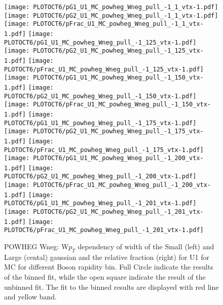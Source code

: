 \documentclass[41pt,a4paper,oneside]{report}
\begin{document}
\begin{figure}[h!]
  \begin{center}
    \texttt{[image: PLOTOCT6/pG1\_U1\_MC\_powheg\_Wneg\_pull\_-1\_1\_vtx-1.pdf]}
    \texttt{[image: PLOTOCT6/pG2\_U1\_MC\_powheg\_Wneg\_pull\_-1\_1\_vtx-1.pdf]}
    \texttt{[image: PLOTOCT6/pFrac\_U1\_MC\_powheg\_Wneg\_pull\_-1\_1\_vtx-1.pdf]} 
    \texttt{[image: PLOTOCT6/pG1\_U1\_MC\_powheg\_Wneg\_pull\_-1\_125\_vtx-1.pdf]}
    \texttt{[image: PLOTOCT6/pG2\_U1\_MC\_powheg\_Wneg\_pull\_-1\_125\_vtx-1.pdf]}
    \texttt{[image: PLOTOCT6/pFrac\_U1\_MC\_powheg\_Wneg\_pull\_-1\_125\_vtx-1.pdf]} 
    \texttt{[image: PLOTOCT6/pG1\_U1\_MC\_powheg\_Wneg\_pull\_-1\_150\_vtx-1.pdf]}
    \texttt{[image: PLOTOCT6/pG2\_U1\_MC\_powheg\_Wneg\_pull\_-1\_150\_vtx-1.pdf]}
    \texttt{[image: PLOTOCT6/pFrac\_U1\_MC\_powheg\_Wneg\_pull\_-1\_150\_vtx-1.pdf]} 
    \texttt{[image: PLOTOCT6/pG1\_U1\_MC\_powheg\_Wneg\_pull\_-1\_175\_vtx-1.pdf]}
    \texttt{[image: PLOTOCT6/pG2\_U1\_MC\_powheg\_Wneg\_pull\_-1\_175\_vtx-1.pdf]}
    \texttt{[image: PLOTOCT6/pFrac\_U1\_MC\_powheg\_Wneg\_pull\_-1\_175\_vtx-1.pdf]} 
    \texttt{[image: PLOTOCT6/pG1\_U1\_MC\_powheg\_Wneg\_pull\_-1\_200\_vtx-1.pdf]}
    \texttt{[image: PLOTOCT6/pG2\_U1\_MC\_powheg\_Wneg\_pull\_-1\_200\_vtx-1.pdf]}
    \texttt{[image: PLOTOCT6/pFrac\_U1\_MC\_powheg\_Wneg\_pull\_-1\_200\_vtx-1.pdf]} 
    \texttt{[image: PLOTOCT6/pG1\_U1\_MC\_powheg\_Wneg\_pull\_-1\_201\_vtx-1.pdf]}
    \texttt{[image: PLOTOCT6/pG2\_U1\_MC\_powheg\_Wneg\_pull\_-1\_201\_vtx-1.pdf]}
    \texttt{[image: PLOTOCT6/pFrac\_U1\_MC\_powheg\_Wneg\_pull\_-1\_201\_vtx-1.pdf]} 
    \caption{POWHEG Wneg: W$p_{T}$ dependency of width of the Small (left) and Large (cental) gaussian and the relative fraction (right) for U1 for MC for different Boson rapidity bin. Full Circle indicate the results of the binned fit, while the open square indicate the result of the unbinned fit. The fit to the binned results are displayed with red line and yellow band. {\color{blue}{plot oder than OCT6}}
\newline
}
    \label{fig:SmallLargeU1POWneg}
  \end{center}
\end{figure}
\end{document}
